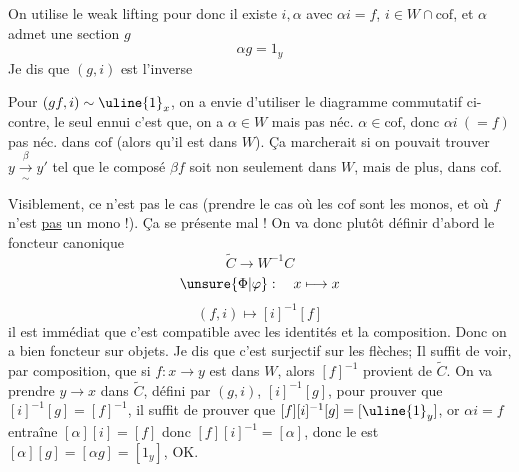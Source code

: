 On utilise le weak lifting  pour
donc il existe $i,\alpha$ avec $\alpha i=f$,  $i\in W\cap\mathrm{cof}$, et $\alpha$ admet une section $g$
\[\alpha g=1_y\]
Je dis que $(g,i)$ est l'inverse  

Pour $(gf,i)\sim\uline{1}_x$, on a envie d'utiliser le diagramme commutatif ci-contre, le seul ennui c'est que, on a $\alpha\in W$ mais pas néc. $\alpha\in\mathrm{cof}$, donc $\alpha i\ (=f)$ pas néc. dans  $\mathrm{cof}$ (alors qu'il est dans $W$).
Ça marcherait si on pouvait trouver $y\xrightarrow[\sim]{\beta}y'$  tel que le composé $\beta f$ soit non seulement dans $W$, mais de plus, dans $\mathrm{cof}$.

Visiblement, ce n'est pas  le cas (prendre le cas où les $\mathrm{cof}$ sont les monos, et où $f$ n'est \uline{pas} un mono !). Ça se présente mal !
On va donc plutôt définir d'abord le foncteur canonique
\[\widetilde C\longrightarrow W^{-1}C\]
\[\unsure{\Phi|\varphi}:\quad x\longmapsto x\]
\[(f,i)\longmapsto[i]^{-1}[f]\]
il est immédiat que c'est compatible avec les identités et la composition. Donc on a bien foncteur   sur objets. Je dis que c'est surjectif sur les flèches; Il suffit de voir, par composition, que si $f:x\longrightarrow y$ est dans $W$, alors $[f]^{-1}$ provient de $\widetilde C$. On va prendre  $y\longrightarrow x$ dans $\widetilde C$, défini par $(g,i)$,  $[i]^{-1}[g]$, pour prouver que $[i]^{-1}[g]=[f]^{-1}$, il suffit de prouver que $[f][i]^{-1}[g]=[\uline{1}_y]$, or $\alpha i=f$ entraîne $[\alpha][i]=[f]$ donc $[f][i]^{-1}=[\alpha]$, donc le  est $[\alpha][g]=[\alpha g]=[1_y]$, OK.
